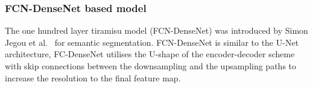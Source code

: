 \subsubsection{FCN-DenseNet based model}
The one hundred layer tiramisu model (FCN-DenseNet) was introduced by Simon Jegou et al.~\cite{Jegou} for semantic segmentation.
FCN-DenseNet is similar to the U-Net architecture, FC-DenseNet utilises the U-shape of the encoder-decoder scheme with skip connections between the downsampling and the upsampling paths to increase the resolution to the final feature map.

